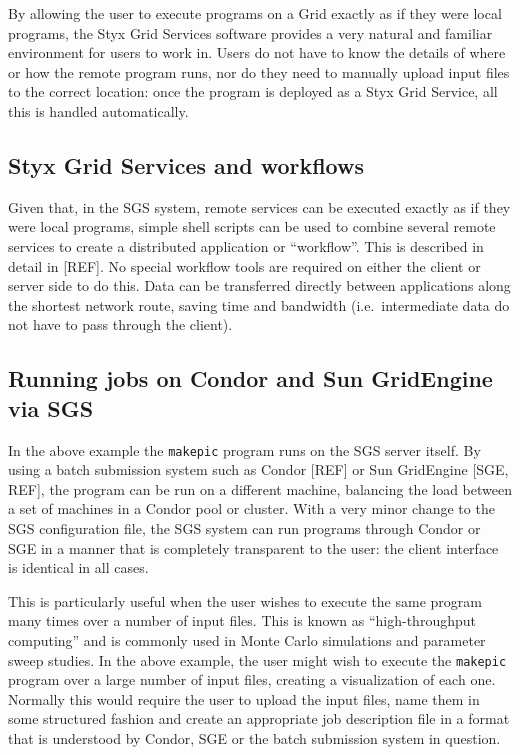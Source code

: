 \documentclass[a4paper]{article}
\begin{document}
\begin{multicols}{2}
By allowing the user to execute programs on a Grid exactly as if they were local programs, the Styx Grid Services software provides a very natural and familiar environment for users to work in.  Users do not have to know the details of where or how the remote program runs, nor do they need to manually upload input files to the correct location: once the program is deployed as a Styx Grid Service, all this is handled automatically.

\subsection{Styx Grid Services and workflows}
Given that, in the SGS system, remote services can be executed exactly as if they were local programs, simple shell scripts can be used to combine several remote services to create a distributed application or ``workflow''.  This is described in detail in [REF].  No special workflow tools are required on either the client or server side to do this.  Data can be transferred directly between applications along the shortest network route, saving time and bandwidth (i.e.\ intermediate data do not have to pass through the client).

\subsection{Running jobs on Condor and Sun GridEngine via SGS}
In the above example the {\tt makepic} program runs on the SGS server itself.  By using a batch submission system such as Condor [REF] or Sun GridEngine [SGE, REF], the program can be run on a different machine, balancing the load between a set of machines in a Condor pool or cluster.  With a very minor change to the SGS configuration file, the SGS system can run programs through Condor or SGE in a manner that is completely transparent to the user: the client interface is identical in all cases.

This is particularly useful when the user wishes to execute the same program many times over a number of input files.  This is known as ``high-throughput computing'' and is commonly used in Monte Carlo simulations and parameter sweep studies.  In the above example, the user might wish to execute the {\tt makepic} program over a large number of input files, creating a visualization of each one.  Normally this would require the user to upload the input files, name them in some structured fashion and create an appropriate job description file in a format that is understood by Condor, SGE or the batch submission system in question.


\end{multicols}
\end{document}
